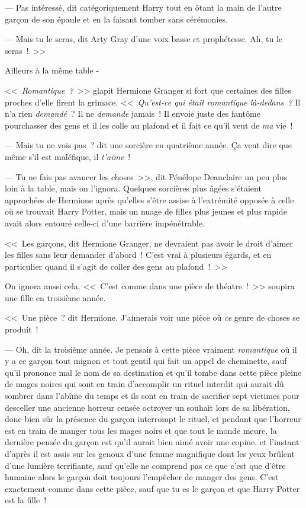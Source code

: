 --- Pas intéressé, dit catégoriquement Harry tout en ôtant la main de l'autre garçon de son épaule et en la faisant tomber sans cérémonies.

--- Mais tu le seras, dit Arty Gray d'une voix basse et prophétesse. Ah, tu le seras~!~>>

Ailleurs à la même table -

<<~\emph{Romantique~?}~>> glapit Hermione Granger si fort que certaines des filles proches d'elle firent la grimace. <<~\emph{Qu'est-ce qui était romantique là-dedans~?} Il n'a rien \emph{demandé}~? Il ne \emph{demande} jamais~! Il envoie juste des fantôme pourchasser des gens et il les colle au plafond et il fait ce qu'il veut de \emph{ma} vie~!

--- Mais tu ne vois pas~? dit une sorcière en quatrième année. Ça veut dire que même s'il est maléfique, il \emph{t'aime}~!

--- Tu ne fais pas avancer les choses~>>, dit Pénélope Deauclaire un peu plus loin à la table, mais on l'ignora. Quelques sorcières plus âgées s'étaient approchées de Hermione après qu'elles s'être assise à l'extrémité opposée à celle où se trouvait Harry Potter, mais un nuage de filles plus jeunes et plus rapide avait alors entouré celle-ci d'une barrière impénétrable.

<<~Les garçons, dit Hermione Granger, ne devraient pas avoir le droit d'aimer les filles sans leur demander d'abord~! C'est vrai à plusieurs égards, et en particulier quand il s'agit de coller des gens au plafond~!~>>

On ignora aussi cela. <<~C'est comme dans une pièce de théatre~!~>> soupira une fille en troisième année.

<<~Une pièce~? dit Hermione. J'aimerais voir une pièce où \emph{ce} genre de choses se produit~!

--- Oh, dit la troisième année. Je pensais à cette pièce vraiment \emph{romantique} où il y a ce garçon tout mignon et tout gentil qui fait un appel de cheminette, sauf qu'il prononce mal le nom de sa destination et qu'il tombe dans cette pièce pleine de mages noires qui sont en train d'accomplir un rituel interdit qui aurait dû sombrer dans l'abîme du temps et ils sont en train de sacrifier sept victimes pour desceller une ancienne horreur censée octroyer un souhait lors de sa libération, donc bien sûr la présence du garçon interrompt le rituel, et pendant que l'horreur est en train de manger tous les mages noirs et que tout le monde meure, la dernière pensée du garçon est qu'il aurait bien aimé avoir une copine, et l'instant d'après il est assis sur les genoux d'une femme magnifique dont les yeux brûlent d'une lumière terrifiante, sauf qu'elle ne comprend pas ce que c'est que d'être humaine alors le garçon doit toujours l'empêcher de manger des gens. C'est exactement comme dans cette pièce, sauf que tu es le garçon et que Harry Potter est la fille~!


